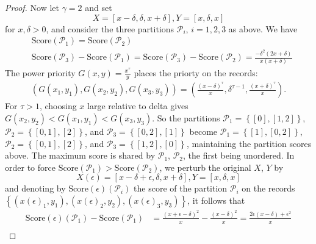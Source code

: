 \documentclass{article}
\theoremstyle{case}
\begin{document}
\begin{proof}
Now let $\gamma = 2$ and set
\[
X = \left[ x-\delta, \delta, x + \delta\right], Y = \left[ x, \delta, x\right]
\] 
for $x, \delta > 0$, and consider the three partitions $\mathcal{P}_i$, $i=1, 2, 3$ as above. We have
\begin{align*}
& \text{Score}\left(\mathcal{P}_1\right) = \text{Score}\left(\mathcal{P}_2\right) \\
& \text{Score}\left(\mathcal{P}_3\right) - \text{Score}\left(\mathcal{P}_1\right) = \text{Score}\left(\mathcal{P}_3\right) - \text{Score}\left(\mathcal{P}_2\right) = \frac{-\delta^2\left( 2x + \delta\right)}{x\left( x + \delta\right)}
\end{align*}
The power priority $G(x,y) = \frac{x^\tau}{y}$ places the priorty on the records:
\begin{align} \label{eq8}
\left( G(x_1, y_1), G(x_2, y_2), G(x_3, y_3)\right) = \left( \frac{\left( x - \delta \right)^{\tau}}{x}, \delta^{\tau-1},  \frac{\left( x + \delta \right)^{\tau}}{x}\right).
\end{align}
For $\tau > 1$, choosing $x$ large relative to delta gives $G(x_2, y_2) < G(x_1, y_1) < G(x_3, y_3)$. So the partitions $\mathcal{P}_1 = \left\lbrace \left[ 0 \right], \left[ 1, 2\right]\right\rbrace$, $\mathcal{P}_2 = \left\lbrace \left[ 0, 1 \right], \left[ 2\right]\right\rbrace$, and $\mathcal{P}_3 = \left\lbrace \left[ 0, 2 \right], \left[ 1 \right]\right\rbrace$ become $\mathcal{P}_1 = \left\lbrace \left[ 1 \right], \left[ 0, 2\right]\right\rbrace$, $\mathcal{P}_2 = \left\lbrace \left[ 0, 1 \right], \left[ 2\right]\right\rbrace$, and $\mathcal{P}_3 = \left\lbrace \left[ 1, 2 \right], \left[ 0 \right]\right\rbrace$, maintaining the partition scores above. The maximum score is shared by $\mathcal{P}_1$, $\mathcal{P}_2$, the first being unordered. In order to force $\text{Score}\left(\mathcal{P}_1\right) > \text{Score}\left(\mathcal{P}_2\right)$, we perturb the original $X$, $Y$ by
\[
X\left(\epsilon\right) = \left[ x-\delta+\epsilon, \delta, x + \delta\right], Y = \left[ x, \delta, x\right]
\]
and denoting by $\text{Score}\left(\epsilon \right)\left(\mathcal{P}_i \right)$ the score of the partition $\mathcal{P}_i$ on the records $\left\lbrace \left(x\left(\epsilon\right)_1, y_1\right),\left(x\left(\epsilon\right)_2, y_2\right),\left(x\left(\epsilon\right)_3, y_3\right) \right\rbrace$, it follows that
\begin{align*}
\text{Score}\left(\epsilon \right)\left(\mathcal{P}_1 \right) - \text{Score}\left(\mathcal{P}_1 \right) &= \frac{\left( x + \epsilon - \delta\right)^2}{x} - \frac{\left( x - \delta\right)^2}{x} = \frac{2\epsilon\left( x - \delta\right) + \epsilon^2}{x} \\

\end{align*}
\end{proof}
\end{document}
